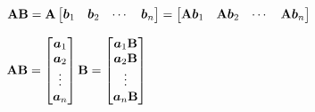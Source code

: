 \begin{theorem}
	\leavevmode
	\begin{outline}[enumerate]
		\1 \( \mathbf{A} \mathbf{B} = \mathbf{A} \begin{bmatrix}
			\bm{b}_1 & \bm{b}_2 & \cdots & \bm{b}_n
		\end{bmatrix}
		=  
		\begin{bmatrix}
			\mathbf{A} \bm{b}_1 & \mathbf{A} \bm{b}_2 & \cdots & \mathbf{A} \bm{b}_n
		\end{bmatrix}
		\)
		
		\1 \( \mathbf{A} \mathbf{B} =  \begin{bmatrix}
			\bm{a}_1 \\ \bm{a}_2 \\ \vdots \\ \bm{a}_n
		\end{bmatrix} \mathbf{B}
		=  
		\begin{bmatrix}
			\bm{a}_1 \mathbf{B} \\ \bm{a}_2 \mathbf{B} \\ \vdots \\ \bm{a}_n \mathbf{B}
		\end{bmatrix}
		\)
	\end{outline}
\end{theorem}

